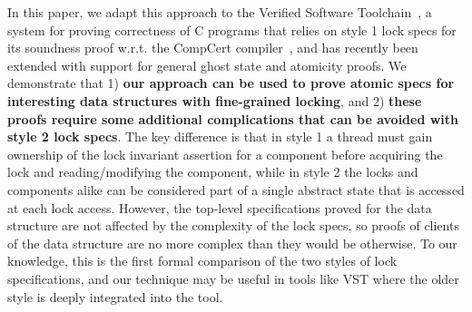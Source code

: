In this paper, we adapt this approach to the Verified Software Toolchain~\cite{plfcc}, a system for proving correctness of C programs that relies on style 1 lock specs for its soundness proof w.r.t. the CompCert compiler~\cite{compcert}, and has recently been extended with support for general ghost state and atomicity proofs. We demonstrate that 1) \textbf{our approach can be used to prove atomic specs for interesting data structures with fine-grained locking}, and 2) \textbf{these proofs require some additional complications that can be avoided with style 2 lock specs}. The key difference is that in style 1 a thread must gain ownership of the lock invariant assertion for a component before acquiring the lock and reading/modifying the component, while in style 2 the locks and components alike can be considered part of a single abstract state that is accessed at each lock access. However, the top-level specifications proved for the data structure are not affected by the complexity of the lock specs, so proofs of clients of the data structure are no more complex than they would be otherwise. To our knowledge, this is the first formal comparison of the two styles of lock specifications, and our technique may be useful in tools like VST where the older style is deeply integrated into the tool.


